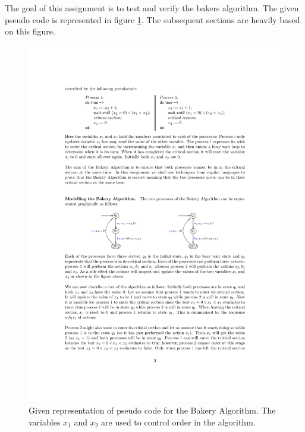 The goal of this assignment is to test and verify the bakers algorithm. The given pseudo code is represented in figure \ref{fig:BA}. The subsequent sections are heavily based on this figure.

\begin{figure}[H]
    \centering
    \includegraphics{Intro/BA}
    \caption{Given representation of pseudo code for the Bakery Algorithm. The variables $x_1$ and $x_2$ are used to control order in the algorithm.}
    \label{fig:BA}
\end{figure}